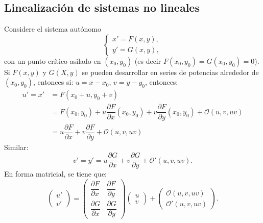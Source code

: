 \documentclass[a5paper,doc,10pt,noapacite]{apa6}
\begin{document}
{{\subsection{Linealización de sistemas no lineales}
%
%
%
Considere el sistema autónomo
\begin{equation}\label{m-11}
	\begin{cases}
		x'=F(x,y) ,
		\\
		y'=G(x,y),
	\end{cases}
\end{equation}
con un punto crítico asilado en \((x_0,y_0)\) (es decir \(F(x_0,y_0)=G(x_0,y_0)=0\)). Si \(F(x,y)\) y \(G(X,y)\) se pueden desarrollar en series de potencias alrededor de \((x_0,y_0)\), entonces si: \(u=x-x_0\), \(v=y-y_0\), entonces:
\begin{align}
	u'=x'&=F(x_0+u,y_0+v)\nonumber\\
		&=F(x_0,y_0)+u\dfrac{\partial F}{\partial x}(x_0,y_0)+v\dfrac{\partial F}{\partial y}(x_0,y_0)+\mathcal{O}(u,v,uv)\nonumber\\
		&=u\dfrac{\partial F}{\partial x}+v\dfrac{\partial F}{\partial y}+\mathcal{O}(u,v,uv)\label{m-12}
\end{align}
Similar:
\begin{equation}\label{m-13}
	v'=y'=u\dfrac{\partial G}{\partial x}+v\dfrac{\partial G}{\partial y}+\mathcal{O}'(u,v,uv).
\end{equation}
En forma matricial, se tiene que:
\begin{equation}\label{m-14}
	\begin{pmatrix} u' \\ v' \end{pmatrix}
	= \begin{pmatrix} \dfrac{\partial F}{\partial x} & \dfrac{\partial F}{\partial y} \\
\dfrac{\partial G}{\partial x} & \dfrac{\partial G}{\partial y} \end{pmatrix} \begin{pmatrix} u \\ v\end{pmatrix}+\begin{pmatrix} \mathcal{O}(u,v,uv) \\ \mathcal{O}'(u,v,uv)\end{pmatrix}.
\end{equation}

}}
\end{document}
